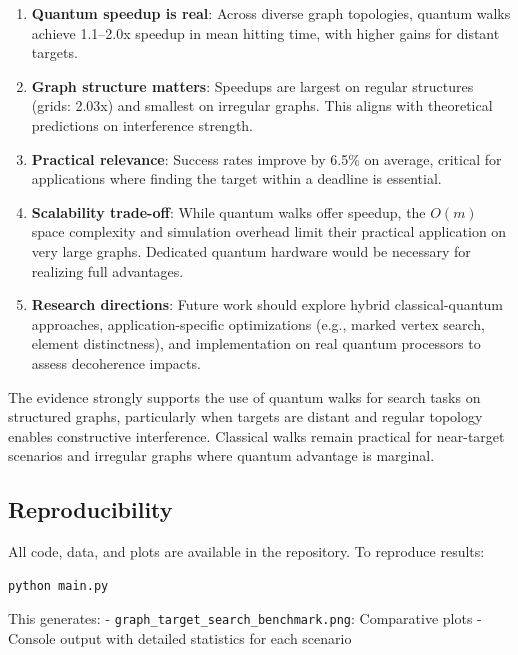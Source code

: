 \documentclass[12pt,a4paper]{article}
\begin{document}
\begin{enumerate}
    \item \textbf{Quantum speedup is real}: Across diverse graph topologies, quantum walks achieve 1.1--2.0x speedup in mean hitting time, with higher gains for distant targets.
    
    \item \textbf{Graph structure matters}: Speedups are largest on regular structures (grids: 2.03x) and smallest on irregular graphs. This aligns with theoretical predictions on interference strength.
    
    \item \textbf{Practical relevance}: Success rates improve by 6.5\% on average, critical for applications where finding the target within a deadline is essential.
    
    \item \textbf{Scalability trade-off}: While quantum walks offer speedup, the $O(m)$ space complexity and simulation overhead limit their practical application on very large graphs. Dedicated quantum hardware would be necessary for realizing full advantages.
    
    \item \textbf{Research directions}: Future work should explore hybrid classical-quantum approaches, application-specific optimizations (e.g., marked vertex search, element distinctness), and implementation on real quantum processors to assess decoherence impacts.
\end{enumerate}

The evidence strongly supports the use of quantum walks for search tasks on structured graphs, particularly when targets are distant and regular topology enables constructive interference. Classical walks remain practical for near-target scenarios and irregular graphs where quantum advantage is marginal.

\subsection{Reproducibility}

All code, data, and plots are available in the repository. To reproduce results:
\begin{verbatim}
python main.py
\end{verbatim}

This generates:
- \texttt{graph\_target\_search\_benchmark.png}: Comparative plots
- Console output with detailed statistics for each scenario
\end{document}
